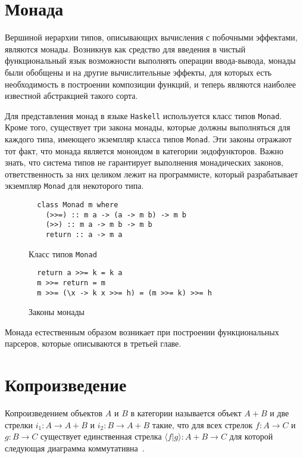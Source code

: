 \section{Монада}

  Вершиной иерархии типов, описывающих вычисления с побочными эффектами,
  являются монады. Возникнув как средство для введения в чистый функциональный
  язык возможности выполнять операции ввода-вывода, монады были обобщены и на
  другие вычислительные эффекты, для которых есть необходимость в построении
  композиции функций, и теперь являются наиболее известной абстракцией такого
  сорта.

  Для представления монад в языке \lstinline{Haskell} используется класс типов
  \lstinline{Monad}. Кроме того, существует три закона монады, которые должны
  выполняться для каждого типа, имеющего экземпляр класса типов \lstinline{Monad}.
  Эти законы отражают тот факт, что монада является моноидом в категории
  эндофункторов. Важно знать, что система типов не гарантирует выполнения
  монадических законов, ответственность за них целиком лежит на программисте,
  который разрабатывает экземпляр \lstinline{Monad} для некоторого типа.

  \begin{figure}[h]
  \begin{lstlisting}
  class Monad m where
    (>>=) :: m a -> (a -> m b) -> m b
    (>>) :: m a -> m b -> m b
    return :: a -> m a
  \end{lstlisting}
  \caption{Класс типов \lstinline{Monad}}
  \label{listing:Monad}
  \end{figure}

  \begin{figure}[h]
  \begin{lstlisting}
  return a >>= k = k a
  m >>= return = m
  m >>= (\x -> k x >>= h) = (m >>= k) >>= h
  \end{lstlisting}
  \caption{Законы монады}
  \label{listing:MonadLaws}
  \end{figure}

  Монада естественным образом возникает при построении функциональных парсеров,
  которые описываются в третьей главе.

\section{Копроизведение}

  Копроизведением объектов $A$ и $B$ в категории называется объект $A + B$ и две
  стрелки $i_1 : A \to A + B$ и $i_2 : B \to A + B$ такие, что для всех стрелок
  $f : A \to C$ и $g : B \to C$ существует единственная стрелка
  $\langle f|g\rangle  : A + B \to C$ для которой следующая диаграмма
  коммутативна~\cite{TeorCat}.


